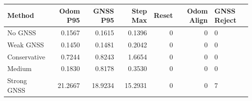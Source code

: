 \begin{tabular}{lrrrrr}
\hline
Method & Odom P95 & GNSS P95 & Step Max & Reset & Odom Align & GNSS Reject \\
\hline
No GNSS & 0.1567 & 0.1615 & 0.1396 & 0 & 0 & 0 \\
Weak GNSS & 0.1450 & 0.1481 & 0.2042 & 0 & 0 & 0 \\
Conservative & 0.7244 & 0.8243 & 1.6654 & 0 & 0 & 0 \\
Medium & 0.1830 & 0.8178 & 0.3530 & 0 & 0 & 0 \\
Strong GNSS & 21.2667 & 18.9234 & 15.2931 & 0 & 0 & 7 \\
\hline
\end{tabular}
